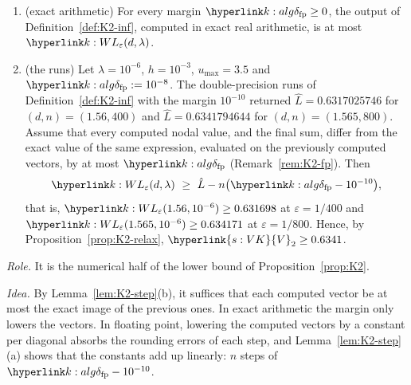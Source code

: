 \documentclass[11pt]{article}
\DeclareRobustCommand{\sy}[2]{{\hyperlink{#1}{#2}}}
\newcommand{\1}{\mathbf{1}}
\newcommand{\VK}{\sy{s:VK}{V}}
\begin{document}
\begin{proposition}\label{prop:K2-Lnum}
\begin{enumerate}
\item[(i)] (exact arithmetic) For every margin $\kdfp\ge0$, the output of Definition~\ref{def:K2-inf}, computed in exact real arithmetic, is at most $\kL(d,\lambda)$.
\item[(ii)] (the runs) Let $\lambda=10^{-6}$, $h=10^{-3}$, $u_{\max}=3.5$ and $\kdfp:=10^{-8}$. The double-precision runs of Definition~\ref{def:K2-inf} with the margin $10^{-10}$
returned $\hat L=0.6317025746$ for $(d,n)=(1.56,400)$ and $\hat L=0.6341794644$ for $(d,n)=(1.565,800)$. Assume that every computed nodal value, and the final sum,
differ from the exact value of the same expression, evaluated on the previously computed vectors, by at most $\kdfp$ (Remark~\ref{rem:K2-fp}). Then
\[
\kL(d,\lambda)\ \ge\ \hat L-n\big(\kdfp-10^{-10}\big),
\]
that is, $\kL(1.56,10^{-6})\ge0.631698$ at $\varepsilon=1/400$ and $\kL(1.565,10^{-6})\ge0.634171$ at $\varepsilon=1/800$. Hence, by Proposition~\ref{prop:K2-relax},
$\VK_2\ge0.6341$.
\end{enumerate}
\end{proposition}
\noindent\textit{Role.} It is the numerical half of the lower bound of Proposition~\ref{prop:K2}.

\noindent\textit{Idea.} By Lemma~\ref{lem:K2-step}(b), it suffices that each computed vector be at most the exact image of the previous ones. In exact arithmetic the
margin only lowers the vectors. In floating point, lowering the computed vectors by a constant per diagonal absorbs the rounding errors of each step, and
Lemma~\ref{lem:K2-step}(a) shows that the constants add up linearly: $n$ steps of $\kdfp-10^{-10}$.
\end{document}

